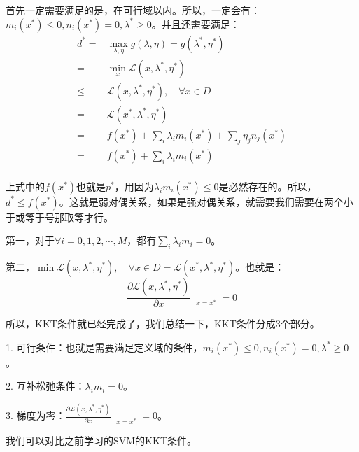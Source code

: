 \documentclass[a4paper]{article}
\begin{document}
首先一定需要满足的是，在可行域以内。所以，一定会有：$m_i(x^\ast)\leq 0,n_i(x^\ast)=0,\lambda^\ast\geq 0$。并且还需要满足：
\begin{equation}
    \begin{split}
        d^\ast 
        = & \max_{\lambda,\eta} g(\lambda,\eta) = g(\lambda^\ast,\eta^\ast) \\
        = & \min_x \mathcal{L}(x,\lambda^\ast,\eta^\ast) \\
        \leq & \mathcal{L}(x,\lambda^\ast,\eta^\ast),\quad \forall x\in D \\
        = & \mathcal{L}(x^\ast,\lambda^\ast,\eta^\ast) \\
        = & f(x^\ast) + \sum_i \lambda_i m_i(x^\ast) + \sum_j \eta_j n_j(x^\ast) \\
        = & f(x^\ast) + \sum_i \lambda_i m_i(x^\ast) \\
    \end{split}
\end{equation}

上式中的$f(x^\ast)$也就是$p^\ast$，用因为$\lambda_i m_i(x^\ast) \leq 0$是必然存在的。所以，$d^\ast \leq f(x^\ast)$。这就是弱对偶关系，如果是强对偶关系，就需要我们需要在两个小于或等于号那取等才行。

第一，对于$\forall i = 0,1,2,\cdots,M$，都有$\sum_{i}\lambda_im_i = 0$。

第二，$ \min \mathcal{L}(x,\lambda^\ast,\eta^\ast),\quad \forall x\in D = \mathcal{L}(x^\ast,\lambda^\ast,\eta^\ast)$。也就是：
\begin{equation}
    \frac{\partial \mathcal{L}(x,\lambda^\ast,\eta^\ast)}{\partial x}\mid_{x=x^\ast} = 0
\end{equation}

所以，KKT条件就已经完成了，我们总结一下，KKT条件分成3个部分。

1. 可行条件：也就是需要满足定义域的条件，$m_i(x^\ast)\leq 0,n_i(x^\ast)=0,\lambda^\ast\geq 0$。

2. 互补松弛条件：$\lambda_im_i=0$。

3. 梯度为零：$\frac{\partial \mathcal{L}(x,\lambda^\ast,\eta^\ast)}{\partial x}\mid_{x=x^\ast} = 0$。

我们可以对比之前学习的SVM的KKT条件。
\end{document}
